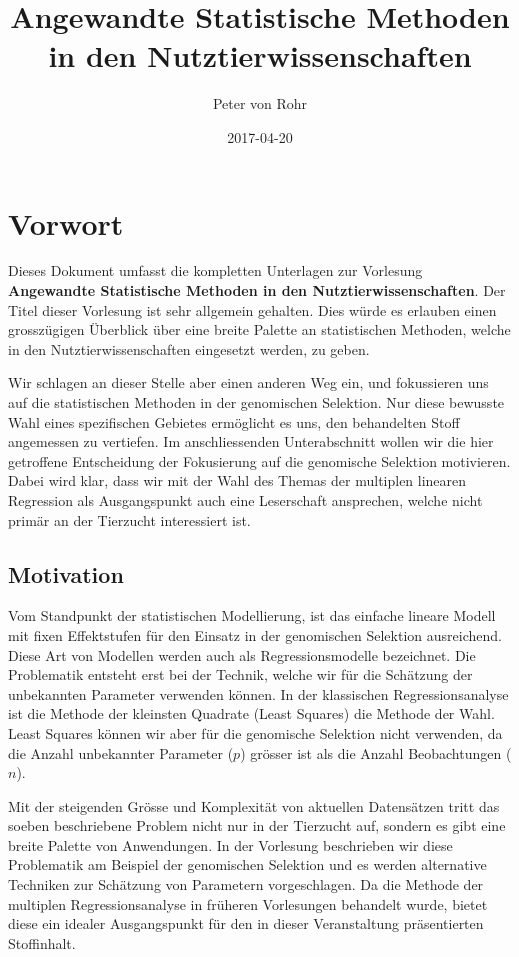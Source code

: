 \documentclass[]{book}
\title{Angewandte Statistische Methoden in den Nutztierwissenschaften}
\author{Peter von Rohr}
\date{2017-04-20}
\begin{document}
\maketitle

{
\setcounter{tocdepth}{1}
\tableofcontents
}
\chapter*{Vorwort}\label{vorwort}

Dieses Dokument umfasst die kompletten Unterlagen zur Vorlesung
\textbf{Angewandte Statistische Methoden in den Nutztierwissenschaften}.
Der Titel dieser Vorlesung ist sehr allgemein gehalten. Dies würde es
erlauben einen grosszügigen Überblick über eine breite Palette an
statistischen Methoden, welche in den Nutztierwissenschaften eingesetzt
werden, zu geben.

Wir schlagen an dieser Stelle aber einen anderen Weg ein, und
fokussieren uns auf die statistischen Methoden in der genomischen
Selektion. Nur diese bewusste Wahl eines spezifischen Gebietes
ermöglicht es uns, den behandelten Stoff angemessen zu vertiefen. Im
anschliessenden Unterabschnitt wollen wir die hier getroffene
Entscheidung der Fokusierung auf die genomische Selektion motivieren.
Dabei wird klar, dass wir mit der Wahl des Themas der multiplen linearen
Regression als Ausgangspunkt auch eine Leserschaft ansprechen, welche
nicht primär an der Tierzucht interessiert ist.

\section*{Motivation}\label{motivation}

Vom Standpunkt der statistischen Modellierung, ist das einfache lineare
Modell mit fixen Effektstufen für den Einsatz in der genomischen
Selektion ausreichend. Diese Art von Modellen werden auch als
Regressionsmodelle bezeichnet. Die Problematik entsteht erst bei der
Technik, welche wir für die Schätzung der unbekannten Parameter
verwenden können. In der klassischen Regressionsanalyse ist die Methode
der kleinsten Quadrate (Least Squares) die Methode der Wahl. Least
Squares können wir aber für die genomische Selektion nicht verwenden, da
die Anzahl unbekannter Parameter (\(p\)) grösser ist als die Anzahl
Beobachtungen (\(n\)).

Mit der steigenden Grösse und Komplexität von aktuellen Datensätzen
tritt das soeben beschriebene Problem nicht nur in der Tierzucht auf,
sondern es gibt eine breite Palette von Anwendungen. In der Vorlesung
beschrieben wir diese Problematik am Beispiel der genomischen Selektion
und es werden alternative Techniken zur Schätzung von Parametern
vorgeschlagen. Da die Methode der multiplen Regressionsanalyse in
früheren Vorlesungen behandelt wurde, bietet diese ein idealer
Ausgangspunkt für den in dieser Veranstaltung präsentierten Stoffinhalt.
\end{document}
